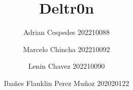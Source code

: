 
\title{\Huge{Deltr0n}}
\author{Adrian Cespedes 202210088 \and Marcelo Chincha 202210092\and Lenin Chavez 202210090 \and Ibañes Flanklin Perez Muñoz 202020122}
\date{\null}
